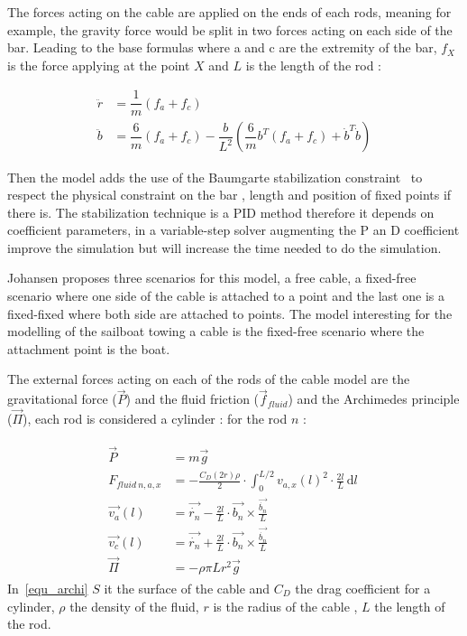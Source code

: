 The forces acting on the cable are applied on the ends of each rods, meaning for example, the gravity force would be split in two forces acting on each side of the bar. Leading to the base formulas where a and c are the extremity of the bar, $f_X$ is the force applying at the point $X$ and $L$ is the length of the rod :

\begin{align}
\ddot{r} &= \dfrac{1}{m}  (f_a+f_c) \\
\ddot{b} &=  \dfrac{6}{m}(f_a+f_c) - \dfrac{b}{L^{2}}  (\dfrac{6}{m}b^{T}(f_a+f_c)+\dot{b}^{T}\dot{b}) 
\end{align}



Then the model adds the use of the Baumgarte stabilization constraint~\cite{baumgarte1972stabilization} to respect the physical constraint on the bar , length and position of fixed points if there is. 
The stabilization technique is a PID method therefore it depends on coefficient parameters, in a variable-step solver augmenting the P an D coefficient improve the simulation but will increase the time needed to do the simulation.

Johansen proposes three scenarios for this model, a free cable, a fixed-free scenario where one side of the cable is attached to a point and the last one is a fixed-fixed where both side are attached to points.
The model interesting for the modelling of the sailboat towing a cable is the fixed-free scenario where the attachment point is the boat.

The external forces acting on each of the rods of the cable model are the gravitational force ($\vec{P}$) and the fluid friction ($\vec{f}_{fluid}$) and the Archimedes principle ($\vec{\Pi}$), each rod is considered a cylinder : for the rod $n$ :

{
\begin{align}
\begin{split}
\vec{P} &= m \vec{g}  \\
F_{fluid~n,a,x} &= -\frac{C_D (2 r ) \rho}{2} \cdot \displaystyle \int_{0}^{L/2} v_{a,x}(l)^2 \cdot \frac{2l}{L} \, \mathrm{d}l\  \\
\vec{v_{a}}(l) &= \vec{\dot{r_n}} - \frac{2 l}{L} \cdot \vec{b_n} \times \frac{\vec{\dot{b_n}}}{L} \nonumber \\
\vec{v_{c}}(l) &= \vec{\dot{r_n}} + \frac{2 l}{L} \cdot \vec{b_n} \times \frac{\vec{\dot{b_n}}}{L} \nonumber\\
\vec{\Pi} &= - \rho \pi L r^2 \vec{g} \label{equ_archi}
\end{split}
\end{align}
}
In~\ref{equ_archi}  $S$  it the surface of the cable and $C_D$ the drag coefficient for a cylinder, $\rho$ the density of the fluid, $r$ is the radius of the cable , $L$ the length of the rod.

